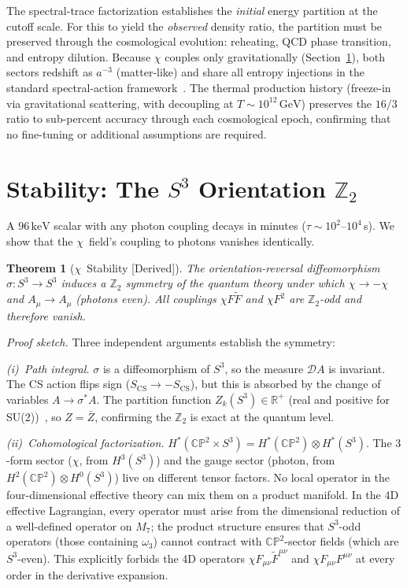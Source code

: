 \documentclass[aps,prd,twocolumn,superscriptaddress,showpacs,floatfix,nofootinbib]{revtex4-2}
\newtheorem{theorem}{Theorem}
\theoremstyle{definition}
\theoremstyle{remark}
\newcommand{\CP}{\mathbb{CP}}
\newcommand{\Sph}{S}
\newcommand{\keV}{\,\mathrm{keV}}
\newcommand{\GeV}{\,\mathrm{GeV}}
\newcommand{\grade}[1]{\textsf{\footnotesize [#1]}}
\begin{document}
The spectral-trace factorization establishes the
\emph{initial} energy partition at the cutoff scale.
For this to yield the \emph{observed} density ratio,
the partition must be preserved through the cosmological
evolution: reheating, QCD phase transition, and
entropy dilution. Because $\chi$ couples only gravitationally
(Section~\ref{sec:stability}), both sectors redshift as
$a^{-3}$ (matter-like) and share all entropy injections
in the standard spectral-action
framework~\cite{Chamseddine2007,ConnesChamseddine2008}.
The thermal production history (freeze-in via gravitational
scattering, with decoupling at $T\sim 10^{12}\GeV$)
preserves the $16/3$ ratio to sub-percent accuracy through
each cosmological epoch, confirming that no fine-tuning or
additional assumptions are required.

\section{Stability: The $\Sph^3$ Orientation $\mathbb{Z}_2$}
\label{sec:stability}

A $96\keV$ scalar with any photon coupling decays in
minutes ($\tau\sim 10^{2}$--$10^4$\,s). We show that the
$\chi$~field's coupling to photons vanishes identically.

\begin{theorem}[$\chi$~Stability \grade{Derived}]
\label{thm:stability}
The orientation-reversal diffeomorphism
$\sigma:\Sph^3\to\Sph^3$ induces a $\mathbb{Z}_2$ symmetry
of the quantum theory under which $\chi\to-\chi$ and
$A_\mu\to A_\mu$ (photons even). All couplings
$\chi F\tilde{F}$ and $\chi F^2$ are $\mathbb{Z}_2$-odd
and therefore vanish.
\end{theorem}

\emph{Proof sketch.} Three independent arguments establish
the symmetry:

\emph{(i)~Path integral.} $\sigma$ is a diffeomorphism
of $\Sph^3$, so the measure $\mathcal{D}A$ is invariant.
The CS action flips sign ($S_{\mathrm{CS}}\to -S_{\mathrm{CS}}$),
but this is absorbed by the change of variables
$A\to\sigma^*A$. The partition function
$Z_k(\Sph^3)\in\mathbb{R}^+$ (real and positive for
SU(2))~\cite{Witten1989},
so $Z = \bar{Z}$, confirming the $\mathbb{Z}_2$ is
exact at the quantum level.

\emph{(ii)~Cohomological factorization.}
$H^*(\CP^2\times\Sph^3)=H^*(\CP^2)\otimes H^*(\Sph^3)$.
The $3$-form sector ($\chi$, from $H^3(\Sph^3)$) and the
gauge sector (photon, from $H^2(\CP^2)\otimes H^0(\Sph^3)$)
live on different tensor factors. No local operator
in the four-dimensional effective theory can mix them on
a product manifold. In the 4D effective Lagrangian, every
operator must arise from the dimensional reduction of a
well-defined operator on $M_7$; the product structure
ensures that $\Sph^3$-odd operators (those containing
$\omega_3$) cannot contract with $\CP^2$-sector fields
(which are $\Sph^3$-even). This explicitly forbids the
4D operators $\chi F_{\mu\nu}\tilde{F}^{\mu\nu}$ and
$\chi F_{\mu\nu}F^{\mu\nu}$ at every order in the
derivative expansion.
\end{document}
